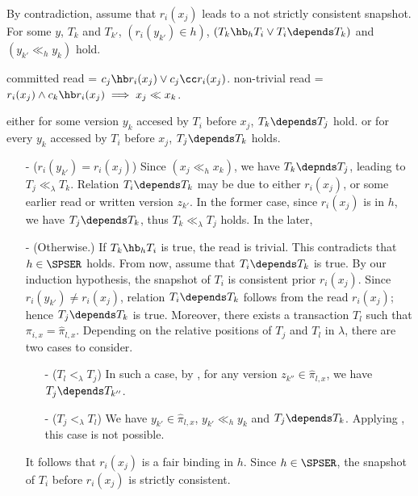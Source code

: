 By contradiction, assume that $r_i(x_j)$ leads to a not strictly consistent snapshot.
For some $y$, $T_k$ and $T_{k'}$, $(r_i(y_{k'}) \in h)$, $(T_k \hb_h T_i \lor T_i \depends T_k)$ and $(y_{k'} \ll_h y_k)$ hold.

committed read = $c_j \hb r_i(x_j) \lor c_j \cc r_i(x_j)$.
non-trivial read = $r_i(x_j) \land c_k \hb r_i(x_j) \implies x_j \ll x_k$.

either for some version $y_k$ accesed by $T_i$ before $x_j$, $T_k \depends T_j$ hold.
or for every $y_k$ accessed by $T_i$ before $x_j$, $T_j \depends T_k$ holds.

\begin{itemize}
\item[-] ($r_i(y_{k'}) = r_i(x_j)$)
  Since $(x_j \ll_h x_k)$, we have $T_k \depnds T_j$, leading to $T_j \ll_{\lambda} T_k$.
  Relation $T_i \depends T_k$ may be due to either $r_i(x_j)$, or some earlier read or written version $z_{k'}$.
  In the former case, since $r_i(x_j)$ is in $h$, we have $T_j \depends T_k$, thus $T_k \ll_{\lambda} T_j$ holds.
  In the later, 
  
\item[-] (Otherwise.)
  If $T_k \hb_h T_i$ is true, the read is trivial.
  This contradicts that $h \in \SPSER$ holds.
  From now, assume that $T_i \depends T_k$ is true.
  By our induction hypothesis, the snapshot of $T_i$ is consistent prior $r_i(x_j)$.
  Since $r_i(y_{k'}) \neq r_i(x_j)$, relation $T_i \depends T_k$ follows from the read $r_i(x_j)$; hence $T_j \depends T_k$ is true.      
  Moreover, there exists a transaction $T_l$ such that $\pi_{i,x} = \hat{\pi}_{l,x}$.
  Depending on the relative positions of $T_j$ and $T_l$ in $\lambda$, there are two cases to consider.
  
  \begin{itemize}
  \item[-] ($T_l <_{\lambda} T_j$)
    In such a case, by , for any version $z_{k''} \in \hat{\pi}_{l,x}$, we have $T_j \depends T_{k''}$.
  \item[-] ($T_j <_{\lambda} T_l$)
    We have $y_{k'} \in \hat{\pi}_{l,x}$, $y_{k'} \ll_h y_k$ and $T_j \depends T_k$.
    Applying  , this case is not possible.
  \end{itemize}
  It follows that $r_i(x_j)$ is a fair binding in $h$.
  Since $h \in \SPSER$, the snapshot of $T_i$ before $r_i(x_j)$ is strictly consistent.
\end{itemize}

